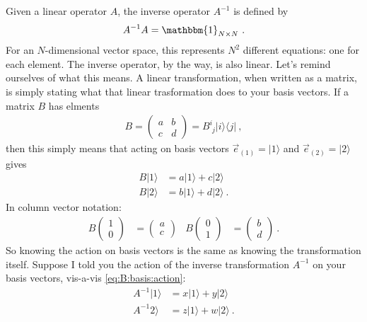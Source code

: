 Given a linear operator $A$, the inverse operator $A^{-1}$ is defined by
\begin{align}
  A^{-1} A = \mathbbm{1}_{N\times N} \ .
\end{align}
For an $N$-dimensional vector space, this represents $N^2$ different equations: one for each element. The inverse operator, by the way, is also linear. Let's remind ourselves of what this means. A linear transformation, when written as a matrix, is simply stating what that linear trasformation does to your basis vectors. If a matrix $B$ has elments
\begin{align}
  B = 
  \begin{pmatrix}
    a & b\\
    c & d
  \end{pmatrix}
  = 
  B^{i}_{\phantom{i}j} |i\rangle\langle j| \ , 
\end{align}
then this simply means that acting on basis vectors $\vec{e}_{(1)} = |1\rangle$ and $\vec{e}_{(2)} = |2\rangle$ gives
\begin{align}
  B|1\rangle &= a |1 \rangle + c|2\rangle 
  \\
  B|2\rangle &= b |1 \rangle + d|2\rangle  \ .
  \label{eq:B:basis:action}
\end{align}
In column vector notation:
\begin{align}
  B
  \begin{pmatrix}
  1 \\ 0
  \end{pmatrix}
  &= 
  \begin{pmatrix}
  a \\ c
  \end{pmatrix}
  &
  B
  \begin{pmatrix}
  0 \\ 1
  \end{pmatrix}
  &=
  \begin{pmatrix}
  b \\ d
  \end{pmatrix}\ .
\end{align}
So knowing the action on basis vectors is the same as knowing the transformation itself. Suppose I told you the action of the inverse transformation $A^{-1}$ on your basis vectors, vis-a-vis \eqref{eq:B:basis:action}:
\begin{align}
  A^{-1}|1\rangle &= x |1 \rangle + y|2\rangle 
  \\
  A^{-1}2\rangle &= z |1 \rangle + w|2\rangle  \ .
  \label{eq:Ainv:basis:action}
\end{align}
